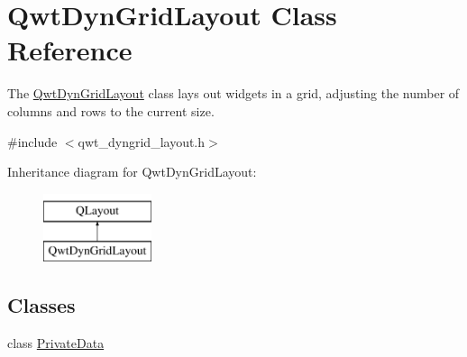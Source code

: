 \hypertarget{class_qwt_dyn_grid_layout}{\section{Qwt\-Dyn\-Grid\-Layout Class Reference}
\label{class_qwt_dyn_grid_layout}
}


The \hyperlink{class_qwt_dyn_grid_layout}{Qwt\-Dyn\-Grid\-Layout} class lays out widgets in a grid, adjusting the number of columns and rows to the current size.  




{\ttfamily \#include $<$qwt\-\_\-dyngrid\-\_\-layout.\-h$>$}

Inheritance diagram for Qwt\-Dyn\-Grid\-Layout\-:\begin{figure}[H]
\begin{center}
\leavevmode
\includegraphics[height=2.000000cm]{class_qwt_dyn_grid_layout}
\end{center}
\end{figure}
\subsection*{Classes}
\begin{DoxyCompactItemize}
\item 
class \hyperlink{class_qwt_dyn_grid_layout_1_1_private_data}{Private\-Data}
\end{DoxyCompactItemize}
